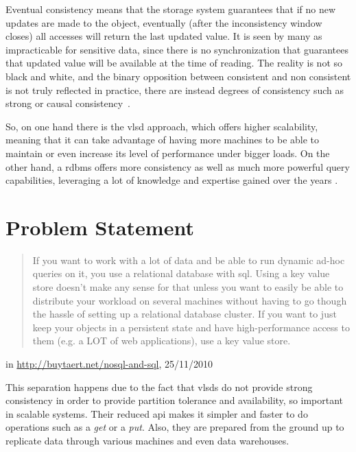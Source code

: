 Eventual consistency means that the storage system guarantees that if no new updates are made to the object, eventually (after the inconsistency window closes) all accesses will return the last updated value. It is seen by many as impracticable for sensitive data, since there is no synchronization that guarantees that updated value will be available at the time of reading. The reality is not so black and white, and the binary opposition between consistent and non consistent is not truly reflected in practice, there are instead degrees of consistency such as strong or causal consistency~\cite{Vogels2008}.

So, on one hand there is the \ac{vlsd} approach, which offers higher scalability, meaning that it can take advantage of having more machines to be able to maintain or even increase its level of performance under bigger loads. On the other hand, a \ac{rdbms} offers more consistency as well as much more powerful query capabilities, leveraging a lot of knowledge and expertise gained over the years \cite{stonebraker2010sql}.  

\section{Problem Statement}

\begin{quote}
If you want to work with a lot of data and be able to run dynamic ad-hoc queries on it, you use a relational database with \ac{sql}. Using a key value store doesn't make any sense for that unless you want to easily be able to distribute your workload on several machines without having to go though the hassle of setting up a relational database cluster. If you want to just keep your objects in a persistent state and have high-performance access to them (e.g. a LOT of web applications), use a key value store.
\end{quote} 
\begin{flushright}in \url{http://buytaert.net/nosql-and-sql}, 25/11/2010\end{flushright}

This separation happens due to the fact that \acp{vlsd} do not provide strong consistency in order to provide partition tolerance and availability, so important in scalable systems. Their reduced \ac{api} makes it simpler and faster to do operations such as a \emph{get} or a \emph{put}. Also, they are prepared from the ground up to replicate data through various machines and even data warehouses.

